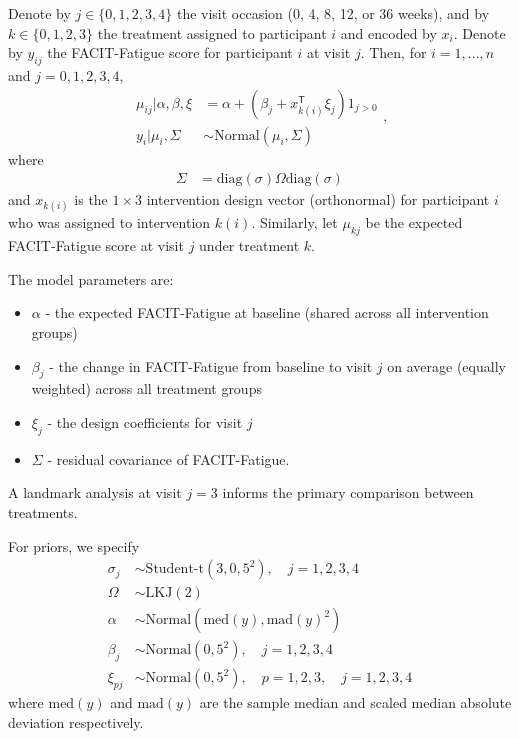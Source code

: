 \documentclass[11pt,parskip=half-]{scrartcl}
\providecommand{\tightlist}{%
  \setlength{\itemsep}{0pt}\setlength{\parskip}{0pt}}
\begin{document}
Denote by $j\in\{0,1,2,3, 4\}$ the visit occasion (0, 4, 8, 12, or 36 weeks), and by $k\in\{0,1,2,3\}$ the treatment assigned to participant $i$ and encoded by $x_i$. Denote by $y_{ij}$ the FACIT-Fatigue score for participant $i$ at visit $j$. Then, for $i=1,...,n$ and $j=0,1,2,3,4$,
$$
  \begin{aligned}
    \mu_{ij}|\alpha,\beta,\xi & = \alpha + (\beta_j + x_{k(i)}^\mathsf{T}\xi_{j})1_{j>0} \\
    y_{i}|\mu_i, \Sigma       & \sim \text{Normal}\left(\mu_{i}, \Sigma\right)
  \end{aligned},
$$
where
$$
  \begin{aligned}
    \Sigma & = \text{diag}(\sigma)\Omega\text{diag}(\sigma)
  \end{aligned}
$$
and $x_{k(i)}$ is the $1\times 3$ intervention design vector (orthonormal) for participant $i$ who was assigned to intervention $k(i)$. Similarly, let $\mu_{kj}$ be the expected FACIT-Fatigue score at visit $j$ under treatment $k$.

The model parameters are:
\begin{itemize}
  \tightlist
  \item $\alpha$ - the expected FACIT-Fatigue at baseline (shared across all intervention groups)
  \item $\beta_j$ - the change in FACIT-Fatigue from baseline to visit $j$ on average (equally weighted) across all treatment groups
  \item $\xi_{j}$ - the design coefficients for visit $j$
  \item $\Sigma$ - residual covariance of FACIT-Fatigue.
\end{itemize}
A landmark analysis at visit $j=3$ informs the primary comparison between treatments.

For priors, we specify
$$
  \begin{aligned}
    \sigma_j & \sim \text{Student-t}(3, 0, 5^2),\quad j=1,2,3,4                    \\
    \Omega   & \sim \text{LKJ}(2)                                                  \\
    \alpha   & \sim \text{Normal}\left(\text{med}(y), \text{mad}(y)^2\right)       \\
    \beta_j  & \sim \text{Normal}\left(0, 5^2\right),\quad j=1,2,3,4               \\
    \xi_{pj} & \sim \text{Normal}\left(0, 5^2\right),\quad p=1,2,3,\quad j=1,2,3,4
  \end{aligned}
$$
where $\text{med}(y)$ and $\text{mad}(y)$ are the sample median and scaled median absolute deviation respectively.
\end{document}
